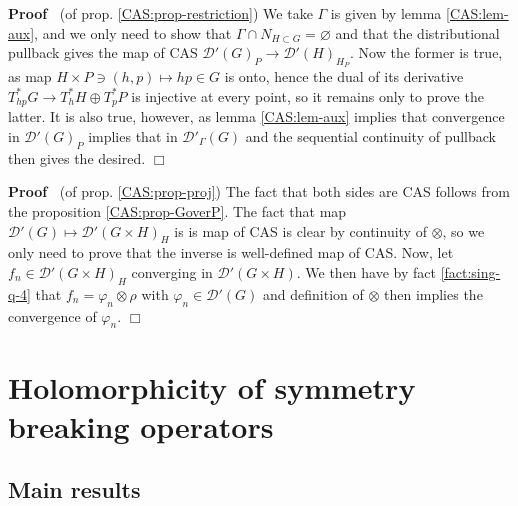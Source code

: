 \documentclass{article}
\newenvironment{proof}{\noindent\textbf{Proof\ }}{\hspace*{\fill}$\Box$\medskip}
\begin{document}
\begin{proof}
  (of prop. \ref{CAS:prop-restriction}) We take $\Gamma$ is given by lemma
  \ref{CAS:lem-aux}, and we only need to show that $\Gamma \cap N_{H \subset
  G} = \varnothing$ and that the distributional pullback gives the map of CAS
  $\mathcal{D}' (G)_P \rightarrow \mathcal{D}' (H)_{H_P}$. Now the former is
  true, as map $H \times P \ni (h, p) \mapsto h p \in G$ is onto, hence the
  dual of its derivative $T_{h p}^{\ast} G \rightarrow T_h^{\ast} H \oplus
  T_p^{\ast} P$ is injective at every point, so it remains only to prove the
  latter. It is also true, however, as lemma \ref{CAS:lem-aux} implies that
  convergence in $\mathcal{D}' (G)_P$ implies that in $\mathcal{D}'_{\Gamma}
  (G)$ and the sequential continuity of pullback then gives the desired.
\end{proof}

\begin{proof}
  (of prop. \ref{CAS:prop-proj}) The fact that both sides are CAS follows from
  the proposition \ref{CAS:prop-GoverP}. The fact that map $\mathcal{D}' (G)
  \mapsto \mathcal{D}' (G \times H)_H$ is is map of CAS is clear by continuity
  of $\otimes$, so we only need to prove that the inverse is well-defined map
  of CAS. Now, let $f_n \in \mathcal{D}' (G \times H)_H$ converging in
  $\mathcal{D}' (G \times H)$. We then have by fact \ref{fact:sing-q-4} that
  $f_n = \varphi_n \otimes \rho$ with $\varphi_n \in \mathcal{D}' (G)$ and
  definition of $\otimes$ then implies the convergence of $\varphi_n$.
\end{proof}

\section{Holomorphicity of symmetry breaking operators}\label{sec:holoop}

\subsection{Main results}
\end{document}
